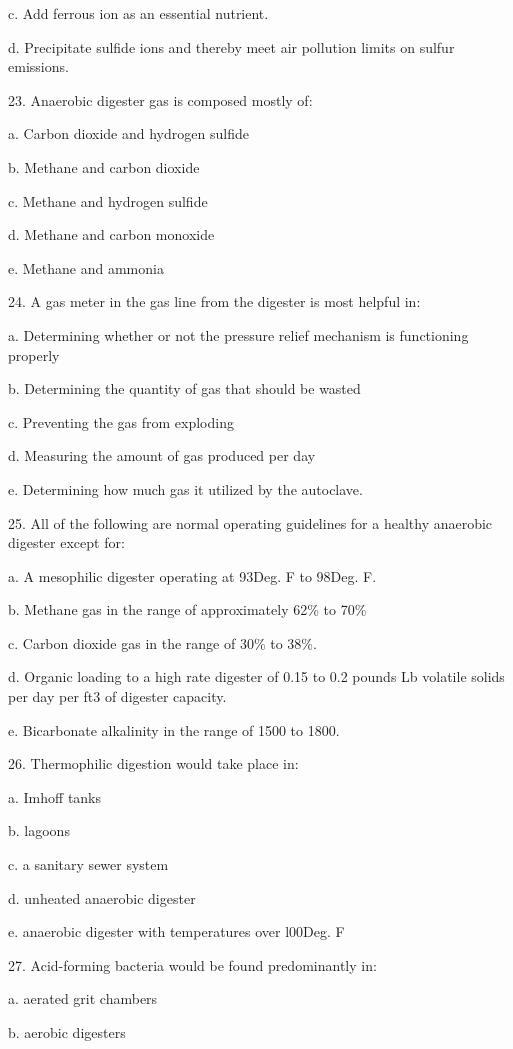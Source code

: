\documentclass{article}
\begin{document}
c. Add ferrous ion as an essential nutrient. 

d. Precipitate sulfide ions and thereby meet air pollution limits on sulfur emissions. 


23. Anaerobic digester gas is composed mostly of:

a. Carbon dioxide and hydrogen sulfide 

b. Methane and carbon dioxide 

c. Methane and hydrogen sulfide 

d. Methane and carbon monoxide 

e. Methane and ammonia 


24. A gas meter in the gas line from the digester is most helpful in:

a. Determining whether or not the pressure relief mechanism is functioning properly 

b. Determining the quantity of gas that should be wasted 

c. Preventing the gas from exploding 

d. Measuring the amount of gas produced per day 

e. Determining how much gas it utilized by the autoclave. 


25. All of the following are normal operating guidelines for a healthy anaerobic digester except for:

a. A mesophilic digester operating at 93Deg. F to 98Deg. F. 

b. Methane gas in the range of approximately 62\% to 70\% 

c. Carbon dioxide gas in the range of 30\% to 38\%. 

d. Organic loading to a high rate digester of 0.15 to 0.2 pounds Lb volatile solids per day per ft3 of digester capacity. 

e. Bicarbonate alkalinity in the range of 1500 to 1800. 


26. Thermophilic digestion would take place in: 

a. Imhoff tanks 

b. lagoons 

c. a sanitary sewer system 

d. unheated anaerobic digester 

e. anaerobic digester with temperatures over l00Deg. F 


27. Acid-forming bacteria would be found predominantly in: 

a. aerated grit chambers 

b. aerobic digesters 
\end{document}

